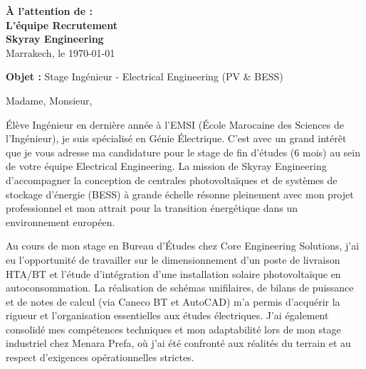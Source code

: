 \documentclass[10pt,a4paper]{../../altacv}
\makeatletter
\renewcommand{\makecvheader}{%
  \begingroup
    \raggedright\color{emphasis}%
    {\Huge\bfseries\MakeUppercase{\@name}\par}
    \medskip
    {\large\bfseries\color{accent}\@tagline\par}
    \medskip
    {\footnotesize\bfseries\@personalinfo\par}
  \endgroup\medskip
}
\makeatother
\begin{document}

\makecvheader

\bigskip
\medskip

\begin{flushright}
  {\color{emphasis}\textbf{À l'attention de :}} \\[2pt]
  \textbf{L'équipe Recrutement} \\
  \textbf{Skyray Engineering} \\[20pt]
  Marrakech, le \today
\end{flushright}
\bigskip

\bigskip

{\color{accent}\textbf{Objet :}} Stage Ingénieur - Electrical Engineering (PV \& BESS)

\bigskip\bigskip

Madame, Monsieur,

\vspace{0.4cm}

Élève Ingénieur en dernière année à l'EMSI (École Marocaine des Sciences de l'Ingénieur), je suis spécialisé en Génie Électrique. C'est avec un grand intérêt que je vous adresse ma candidature pour le stage de fin d'études (6 mois) au sein de votre équipe Electrical Engineering. La mission de Skyray Engineering d'accompagner la conception de centrales photovoltaïques et de systèmes de stockage d'énergie (BESS) à grande échelle résonne pleinement avec mon projet professionnel et mon attrait pour la transition énergétique dans un environnement européen.

\vspace{0.4cm}

Au cours de mon stage en Bureau d'Études chez Core Engineering Solutions, j'ai eu l'opportunité de travailler sur le dimensionnement d'un poste de livraison HTA/BT et l'étude d'intégration d'une installation solaire photovoltaïque en autoconsommation. La réalisation de schémas unifilaires, de bilans de puissance et de notes de calcul (via Caneco BT et AutoCAD) m'a permis d'acquérir la rigueur et l'organisation essentielles aux études électriques. J'ai également consolidé mes compétences techniques et mon adaptabilité lors de mon stage industriel chez Menara Prefa, où j'ai été confronté aux réalités du terrain et au respect d'exigences opérationnelles strictes.
\end{document}
